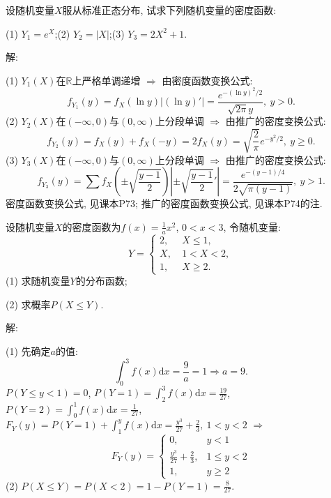 \documentclass[standard]{ExBook}
\renewenvironment{shaded}{%
  \def\FrameCommand{\fboxsep=\FrameSep \colorbox{shadecolor}}%
  \MakeFramed{\advance\hsize-\width \FrameRestore}%
}{%
  \endMakeFramed
}
\begin{document}
\begin{qitems}
\vspace{2.5cm-5em}

    \begin{bbox}
    \begin{shaded}
        \qitem
设随机变量$X$服从标准正态分布, 试求下列随机变量的密度函数:

(1) $Y_{1}=e^X$;\qquad(2) $Y_{2}=|X|$;\qquad(3) $Y_{3}=2X^2+1$.
    \end{shaded}
    \end{bbox}

\vspace{\dimexpr2.5cm-5em\relax}

解: 

(1) $Y_1(X)$在$\mathbb{R}$上严格单调递增 $\Longrightarrow$ 由密度函数变换公式:
$$f_{Y_1}(y)=f_{X}(\ln y)|(\ln y)'|=\displaystyle\frac{e^{-(\ln y)^2/2}}{\sqrt{2\pi}y},\ y>0.$$
(2) $Y_2(X)$在$(-\infty,0)$与$(0,\infty)$上分段单调 $\Longrightarrow$ 由推广的密度变换公式:
$$f_{Y_2}(y)=f_{X}(y)+f_{X}(-y)=2f_{X}(y)=\displaystyle\sqrt{\frac{2}{\pi}}e^{-y^2/2},\ y \geq 0.$$
(3) $Y_3(X)$在$(-\infty,0)$与$(0,\infty)$上分段单调 $\Longrightarrow$ 由推广的密度变换公式:
$$f_{Y_3}(y)=\sum f_{X}(\pm\sqrt{\displaystyle\frac{y-1}{2}})\left|\pm\sqrt{\displaystyle\frac{y-1}{2}}'\right|=\displaystyle\frac{e^{-(y-1)/4}}{2\sqrt{\pi(y-1)}},\ y > 1.$$
\textcolor{themeColor}{\selectfont {} 密度函数变换公式, 见课本P73; 推广的密度函数变换公式, 见课本P74的注.}

\vspace{2.5cm-5em}

    \begin{bbox}
    \begin{shaded}
        \qitem
设随机变量$X$的密度函数为$f(x)=\frac{1}{a}x^2$, $0 < x < 3$, 令随机变量:
$$
    Y=
    \left\{
    \begin{array}{ll}
        2,\ &X \leq 1,\\
        X,\ &1 < X < 2,\\
        1,\ &X \geq 2.
    \end{array}
    \right.
$$
(1) 求随机变量$Y$的分布函数;

(2) 求概率$P(X\leq Y)$.
    \end{shaded}
    \end{bbox}

\vspace{\dimexpr2.5cm-5em\relax}

解: 

(1) 先确定$a$的值:
$$\displaystyle\int_{0}^{3}f(x)\mathrm{d}x=\frac{9}{a}=1 \Longrightarrow a=9.$$
$P(Y\leq y<1)=0$, $P(Y=1)=\displaystyle\int_{2}^{3}f(x)\mathrm{d}x=\frac{19}{27}$, $P(Y=2)=\displaystyle\int_{0}^{1}f(x)\mathrm{d}x=\frac{1}{27}$, $F_{Y}(y)=P(Y=1)+\displaystyle\int_{1}^{y}f(x)\mathrm{d}x=\frac{y^3}{27}+\frac{2}{3},\ 1<y<2$ $\Longrightarrow$
$$
    F_{Y}(y)=
    \left\{
    \begin{array}{ll}
        0, &y<1\\
        \frac{y^3}{27}+\frac{2}{3}, &1\leq y<2\\
        1, &y\geq 2
    \end{array}
    \right.
$$
(2) $P(X\leq Y)=P(X<2)=1-P(Y=1)=\displaystyle\frac{8}{27}$.


\end{qitems}
\end{document}
